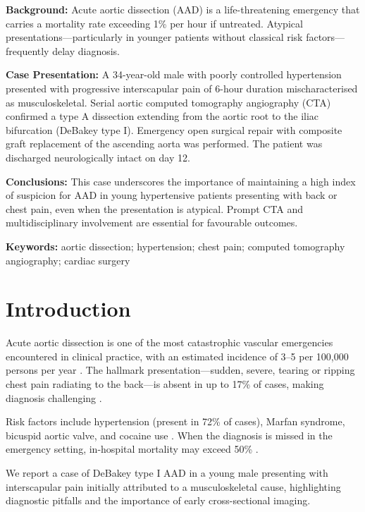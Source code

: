 \documentclass[11pt,a4paper]{article}
\begin{document}
\begin{abstractbox}
\textbf{Background:}
Acute aortic dissection (AAD) is a life-threatening emergency that carries a mortality rate
exceeding 1\% per hour if untreated. Atypical presentations—particularly in younger patients
without classical risk factors—frequently delay diagnosis.

\smallskip
\textbf{Case Presentation:}
A 34-year-old male with poorly controlled hypertension presented with progressive interscapular
pain of 6-hour duration mischaracterised as musculoskeletal. Serial aortic computed tomography
angiography (CTA) confirmed a type A dissection extending from the aortic root to the
iliac bifurcation (DeBakey type I). Emergency open surgical repair with composite graft
replacement of the ascending aorta was performed. The patient was discharged neurologically
intact on day 12.

\smallskip
\textbf{Conclusions:}
This case underscores the importance of maintaining a high index of suspicion for AAD in young
hypertensive patients presenting with back or chest pain, even when the presentation is
atypical. Prompt CTA and multidisciplinary involvement are essential for favourable outcomes.

\smallskip
\textbf{Keywords:}
aortic dissection; hypertension; chest pain; computed tomography angiography; cardiac surgery
\end{abstractbox}

\vspace{6pt}

\section{Introduction}

Acute aortic dissection is one of the most catastrophic vascular emergencies encountered in
clinical practice, with an estimated incidence of 3--5 per 100{,}000 persons per year
\cite{erbel2014}. The hallmark presentation—sudden, severe, tearing or ripping chest pain
radiating to the back—is absent in up to 17\% of cases, making diagnosis challenging
\cite{meszaros2000}.

Risk factors include hypertension (present in 72\% of cases), Marfan syndrome, bicuspid aortic
valve, and cocaine use \cite{nienaber2016}. When the diagnosis is missed in the emergency
setting, in-hospital mortality may exceed 50\% \cite{bossone2018}.

We report a case of DeBakey type I AAD in a young male presenting with interscapular pain
initially attributed to a musculoskeletal cause, highlighting diagnostic pitfalls and the
importance of early cross-sectional imaging.
\end{document}
